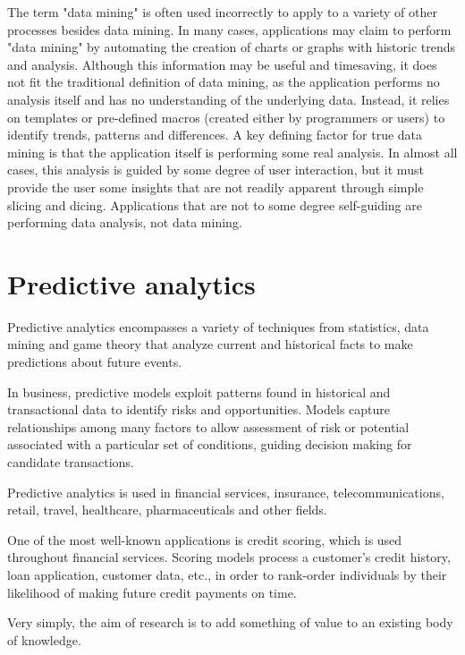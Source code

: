 \documentclass[12pt]{article}
\begin{document}
The term "data mining" is often used incorrectly to apply to a variety of other processes besides data mining. In many cases, applications may claim to perform "data mining" by automating the creation of charts or graphs with historic trends and analysis. Although this information may be useful and timesaving, it does not fit the traditional definition of data mining, as the application performs no analysis itself and has no understanding of the underlying data. Instead, it relies on templates or pre-defined macros (created either by programmers or users) to identify trends, patterns and differences. A key defining factor for true data mining is that the application itself is performing some real analysis. In almost all cases, this analysis is guided by some degree of user interaction, but it must provide the user some insights that are not readily apparent through simple slicing and dicing. Applications that are not to some degree self-guiding are performing data analysis, not data mining.




\section{Predictive analytics}

Predictive analytics encompasses a variety of techniques from statistics, data mining and game theory that analyze current and historical facts to make predictions about future events.

In business, predictive models exploit patterns found in historical and transactional data to identify risks and opportunities. Models capture relationships among many factors to allow assessment of risk or potential associated with a particular set of conditions, guiding decision making for candidate transactions.

Predictive analytics is used in financial services, insurance, telecommunications, retail, travel, healthcare, pharmaceuticals and other fields.

One of the most well-known applications is credit scoring, which is used throughout financial services. Scoring models process a customer's credit history, loan application, customer data, etc., in order to rank-order individuals by their likelihood of making future credit payments on time.



Very simply, the aim of research is to add something of value to an existing body of knowledge.
\end{document}
